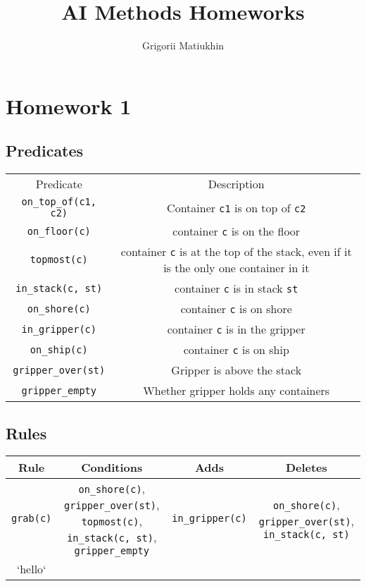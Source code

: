 \documentclass[12pt]{article}
\author{Grigorii Matiukhin}
\title{AI Methods Homeworks}
\begin{document}
\maketitle
\tableofcontents
\newpage

\section{Homework 1}

\subsection{Predicates}
\begin{tabular}{|| c | c || }
  Predicate & Description \\
  \texttt{on\_top\_of(c1, c2)} & Container \texttt{c1} is on top of \texttt{c2} \\
  \texttt{on\_floor(c)} & container \texttt{c} is on the floor \\
  \texttt{topmost(c)} & container \texttt{c} is at the top of the stack, even if it is the only one container in it \\
  \texttt{in\_stack(c, st)} & container \texttt{c} is in stack \texttt{st} \\
  \texttt{on\_shore(c)} & container \texttt{c} is on shore \\
  \texttt{in\_gripper(c)} & container \texttt{c} is in the gripper \\
  \texttt{on\_ship(c)} & container \texttt{c} is on ship \\
  \texttt{gripper\_over(st)} & Gripper is above the stack \\
  \texttt{gripper\_empty} & Whether gripper holds any containers \\
\end{tabular}

\subsection{Rules}
\begin{tabular}{|| c | c | c | c || }
  Rule & Conditions & Adds & Deletes \\
  \hline\hline
  \texttt{grab(c)} & \texttt{on\_shore(c)}, \texttt{gripper\_over(st)}, \texttt{topmost(c)}, \texttt{in\_stack(c, st)}, \texttt{gripper\_empty} & \texttt{in\_gripper(c)} & \texttt{on\_shore(c)}, \texttt{gripper\_over(st)}, \texttt{in\_stack(c, st)} \\
  \hline
  `hello`
\end{tabular}
 
\end{document}
